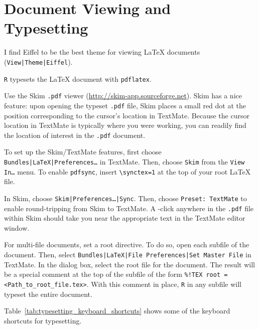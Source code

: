\documentclass[10pt]{article}
\begin{document}


\section{Document Viewing and Typesetting} %
\label{sec:document_viewing_and_typesetting}
I find Eiffel to be the best theme for viewing \LaTeX{} documents
(\texttt{View|Theme|Eiffel}). 

\cmdkey\texttt{R} typesets the \LaTeX{} document with \texttt{pdflatex}. 

Use the Skim \texttt{.pdf} viewer (\url{http://skim-app.sourceforge.net}).
Skim has a nice feature: upon opening the typeset \texttt{.pdf} file,
Skim places a small red dot at the position corresponding to the cursor's 
location in TextMate. 
Because the cursor location in TextMate is typically where you were working,
you can readily find the location of interest in the \texttt{.pdf} document.

To set up the Skim/TextMate features, 
first choose \texttt{Bundles|LaTeX|Preferences\dots} in TextMate.
Then, choose \texttt{Skim} from the \texttt{View In\dots} menu.
To enable \texttt{pdfsync}, insert \verb!\synctex=1! 
at the top of your root \LaTeX{} file.

In Skim, choose \texttt{Skim|Preferences\dots|Sync}. 
Then, choose \texttt{Preset:~TextMate} to enable round-tripping from Skim to TextMate. 
A \cmdkey\shiftkey-click anywhere in the \texttt{.pdf} file within Skim 
should take you near the appropriate text in the TextMate editor window.

For multi-file documents, set a root directive. 
To do so, open each subfile of the document. 
Then, select \texttt{Bundles|LaTeX|File Preferences|Set Master File} in TextMate.
In the dialog box, select the root file for the document. 
The result will be a special comment at the top of the subfile of the form
\verb&%!TEX root = <Path_to_root_file.tex>&.
With this comment in place, \cmdkey\texttt{R} in any subfile will typeset the entire document.

Table~\ref{tab:typesetting_keyboard_shortcuts} shows some of the keyboard shortcuts for typesetting.
\end{document}
